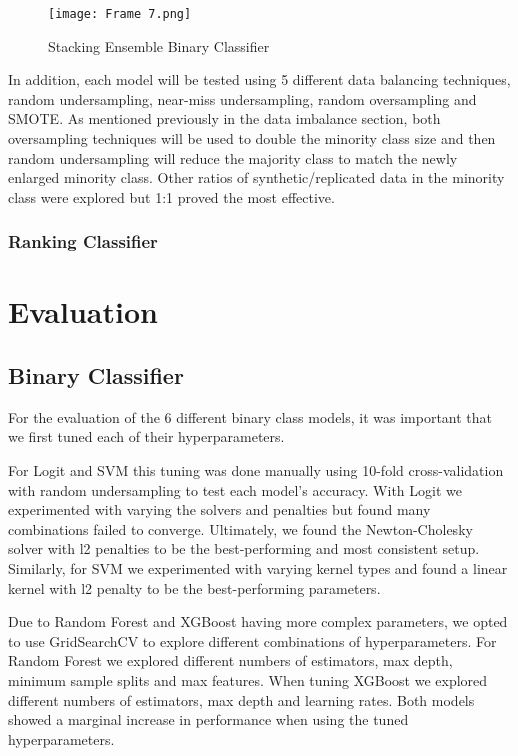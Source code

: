 \documentclass[conference]{IEEEtran}
\begin{document}
\begin{figure}[htbp]
\centerline{\texttt{[image: Frame 7.png]}}
\caption{Stacking Ensemble Binary Classifier}
\label{fig3}
\end{figure}

In addition, each model will be tested using 5 different data balancing techniques, random undersampling, near-miss undersampling, random oversampling and SMOTE. As mentioned previously in the data imbalance section, both oversampling techniques will be used to double the minority class size and then random undersampling will reduce the majority class to match the newly enlarged minority class. Other ratios of synthetic/replicated data in the minority class were explored but 1:1 proved the most effective. 

\subsubsection{Ranking Classifier}

\section{Evaluation}
\subsection{Binary Classifier}
For the evaluation of the 6 different binary class models, it was important that we first tuned each of their hyperparameters.

For Logit and SVM this tuning was done manually using 10-fold cross-validation with random undersampling to test each model's accuracy.
With Logit we experimented with varying the solvers and penalties but found many combinations failed to converge. Ultimately, we found the Newton-Cholesky solver with l2 penalties to be the best-performing and most consistent setup. Similarly, for SVM we experimented with varying kernel types and found a linear kernel with l2 penalty to be the best-performing parameters.

Due to Random Forest and XGBoost having more complex parameters, we opted to use GridSearchCV to explore different combinations of hyperparameters. For Random Forest we explored different numbers of estimators, max depth, minimum sample splits and max features. When tuning XGBoost we explored different numbers of estimators, max depth and learning rates. Both models showed a marginal increase in performance when using the tuned hyperparameters.
\end{document}
